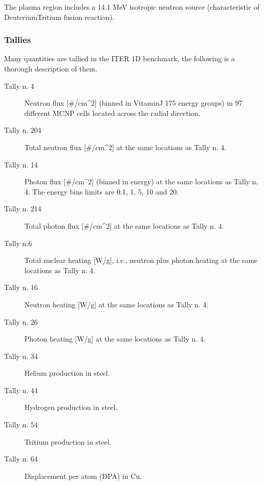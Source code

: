 \documentclass[letterpaper,10pt,english]{sphinxmanual}
\begin{document}
The plasma region includes a 14.1 MeV isotropic neutron source
(characteristic of Deuterium\sphinxhyphen{}Tritium fusion reaction).


\subsubsection{Tallies}
\label{\detokenize{usage/benchmarks:id2}}
Many quantities are tallied in the ITER 1D benchmark, the following is a thorough
description of them.
\begin{description}
\item[{Tally n. 4}] \leavevmode
Neutron flux {[}\#/cm\textasciicircum{}2{]} (binned in Vitamin\sphinxhyphen{}J 175 energy groups) in 97 different MCNP cells located across the radial direction.

\item[{Tally n. 204}] \leavevmode
Total neutron flux {[}\#/cm\textasciicircum{}2{]} at the same locations as Tally n. 4.

\item[{Tally n. 14}] \leavevmode
Photon flux {[}\#/cm\textasciicircum{}2{]} (binned in energy) at the same locations as Tally n. 4. The energy bins limits are 0.1, 1, 5, 10 and 20.

\item[{Tally n. 214}] \leavevmode
Total photon flux {[}\#/cm\textasciicircum{}2{]} at the same locations as Tally n. 4.

\item[{Tally n.6}] \leavevmode
Total nuclear heating {[}W/g{]}, i.e., neutron plus photon heating at the same locations as Tally n. 4.

\item[{Tally n. 16}] \leavevmode
Neutron heating {[}W/g{]} at the same locations as Tally n. 4.

\item[{Tally n. 26}] \leavevmode
Photon heating {[}W/g{]} at the same locations as Tally n. 4.

\item[{Tally n. 34}] \leavevmode
Helium production in steel.

\item[{Tally n. 44}] \leavevmode
Hydrogen production in steel.

\item[{Tally n. 54}] \leavevmode
Tritium production in steel.

\item[{Tally n. 64}] \leavevmode
Displacement per atom (DPA) in Cu.


\end{description}
\end{document}
